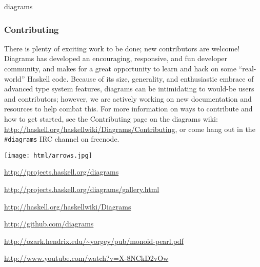 \begin{hcarentry}[updated]{diagrams}
\subsubsection*{Contributing}

There is plenty of exciting work to be done; new contributors are welcome!
Diagrams has developed an encouraging, responsive, and fun developer
community, and makes for a great opportunity to learn and hack on some
``real-world'' Haskell code. Because of its size, generality, and enthusiastic
embrace of advanced type system features, diagrams can be intimidating to
would-be users and contributors; however, we are actively working on new
documentation and resources to help combat this. For more information on ways
to contribute and how to get started, see the Contributing page on the
diagrams wiki: \url{http://haskell.org/haskellwiki/Diagrams/Contributing}, or
come hang out in the \texttt{\#diagrams} IRC channel on freenode.

\begin{center}
\texttt{[image: html/arrows.jpg]}
\end{center}

\FurtherReading
\begin{compactitem}
\item \url{http://projects.haskell.org/diagrams}
\item \url{http://projects.haskell.org/diagrams/gallery.html}
\item \url{http://haskell.org/haskellwiki/Diagrams}
\item \url{http://github.com/diagrams}
\item \url{http://ozark.hendrix.edu/~yorgey/pub/monoid-pearl.pdf}
\item \url{http://www.youtube.com/watch?v=X-8NCkD2vOw}
\end{compactitem}
\end{hcarentry}
